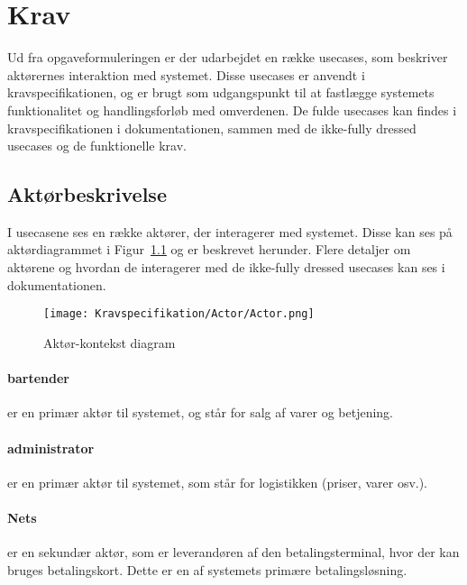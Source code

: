 \chapter{Krav}
Ud fra opgaveformuleringen er der udarbejdet en række \gls{usecase}s, som beskriver aktørernes interaktion med systemet. Disse \gls{usecase}s er anvendt i kravspecifikationen, og er brugt som udgangspunkt til at fastlægge systemets funktionalitet og handlingsforløb med omverdenen. De fulde \gls{usecase}s kan findes i kravspecifikationen i dokumentationen, sammen med de ikke-fully dressed \gls{usecase}s og de funktionelle krav.
\newline

\begin{minipage}{0.45\textwidth}
\raggedright
\section{Aktørbeskrivelse}
I \gls{usecase}ne ses en række aktører, der interagerer med systemet. Disse kan ses på aktørdiagrammet i Figur~\ref{fig:actordiagram} og er beskrevet herunder. Flere detaljer om aktørene og hvordan de interagerer med de ikke-fully dressed \gls{usecase}s kan ses i dokumentationen. 
\newline
\newline
\end{minipage}
\begin{minipage}{0.55\textwidth}
\begin{figure}[H]
	\centering
	\texttt{[image: Kravspecifikation/Actor/Actor.png]}
	\caption{Aktør-kontekst diagram}
	\label{fig:actordiagram}
\end{figure}
\end{minipage} \hfill
\newline
\subsubsection*{\Gls{bartender}}
er en primær aktør til systemet, og står for salg af varer og betjening. 

\subsubsection*{\Gls{administrator}}
er en primær aktør til systemet, som står for logistikken (priser, varer osv.). 

\subsubsection*{Nets}
er en sekundær aktør, som er leverandøren af den \gls{betalingsterminal}, hvor der kan bruges \gls{betalingskort}. Dette er en af systemets primære betalingsløsning.

